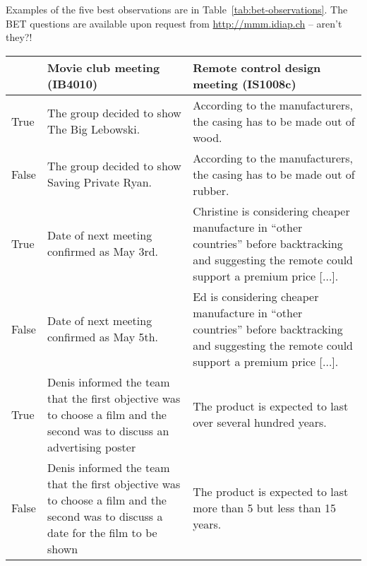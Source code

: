 \documentclass[11pt]{article}
\begin{document}
Examples of the five best observations are in Table~\ref{tab:bet-observations}.
The BET questions are available upon request from \url{http://mmm.idiap.ch} -- aren't they?!

\begin{table*}
\begin{center}
\small
\begin{tabular}{|l|p{6.6cm}|p{7cm}|}
\hline 
 & \bf Movie club meeting (IB4010) & \bf Remote control design meeting (IS1008c) \\ 
\hline
True & The group decided to show The Big Lebowski. & According to the manufacturers, the casing has to be made out of wood.\\
False & The group decided to show Saving Private Ryan. & According to the manufacturers, the casing has to be
made out of rubber.\\
\hline
True & Date of next meeting confirmed as May 3rd. & Christine is considering cheaper manufacture in ``other
countries'' before backtracking and suggesting the remote could support a premium price [$\ldots$]. \\
False & Date of next meeting confirmed as May 5th. & Ed is considering cheaper manufacture in ``other
countries'' before backtracking and suggesting the remote could support a premium price [$\ldots$].\\
\hline
True & Denis informed the team that the first objective was to choose a film and the second was to discuss an advertising poster & The product is expected to last over several hundred years. \\
False & Denis informed the team that the first objective was to choose a film and the second was to discuss a date for the film to be shown & The product is expected to last more than 5 but less than 15 years. \\
\hline
\end{tabular}
\normalsize
\end{center}
\caption{\label{tab:bet-observations} First five most quoted observations of interests, in true/false representation.}
\end{table*}

\end{document}
